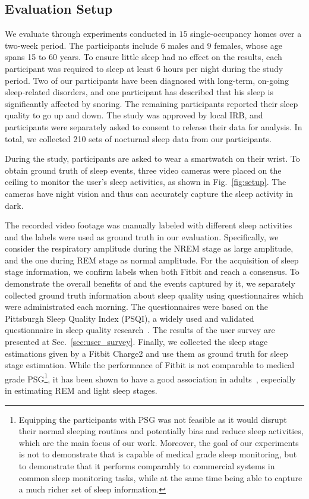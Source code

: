 \subsection{Evaluation Setup\label{sec:evalusers}}

 We evaluate {\systemname} through experiments conducted in $15$ single-occupancy homes over a two-week period.
The participants include 6 males and 9 females, whose age spans 15 to 60 years. To ensure little sleep had no effect on the results, each
participant was required to sleep at least $6$ hours per night during the study period. Two of our participants have been diagnosed with
long-term, on-going sleep-related disorders, and one participant has described that his sleep is significantly affected by snoring. The
remaining participants reported their sleep quality to go up and down. The study was approved by local IRB, and participants were
separately asked to consent to release their data for analysis. In total, we collected 210 sets of nocturnal sleep data from our
participants.

 During the study, participants are asked to wear a smartwatch on their wrist. To obtain ground truth of sleep events,
three video cameras were placed on the ceiling to monitor the user's sleep activities, as shown in Fig.~\ref{fig:setup}. The cameras have
night vision and thus can accurately capture the sleep activity in dark.


 The recorded video footage was manually labeled with different sleep activities and the labels
were used as ground truth in our evaluation. Specifically, we consider the respiratory amplitude during the NREM stage as large amplitude,
and the one during REM stage as normal amplitude. For the acquisition of sleep stage information, we confirm labels when both Fitbit and
{\systemname} reach a consensus. To demonstrate the overall benefits of {\systemname} and the events captured by it, we separately
collected ground truth information about sleep quality using questionnaires which were administrated each morning. The questionnaires were
based on the Pittsburgh Sleep Quality Index (PSQI), a widely used and validated questionnaire in sleep quality
research~\cite{buysse1989pittsburgh}. The results of the user survey are presented at Sec.~\ref{sec:user_survey}. Finally, we collected the
sleep stage estimations given by a Fitbit Charge2 and use them as ground truth for sleep stage estimation. While the performance of Fitbit
is not comparable to medical grade PSG\footnote{Equipping the participants with PSG was not feasible as it would disrupt their normal
sleeping routines and potentially bias and reduce sleep activities, which are the main focus of our work. Moreover, the goal of our
experiments is not to demonstrate that {\systemname} is capable of medical grade sleep monitoring, but to demonstrate that it performs
comparably to commercial systems in common sleep monitoring tasks, while at the same time being able to capture a much richer set of sleep
information.}, it has been shown to have a good association in adults~\cite{evenson2015systematic,fitbit01,fitbit02,fitbit03}, especially
in estimating REM and light sleep stages.


